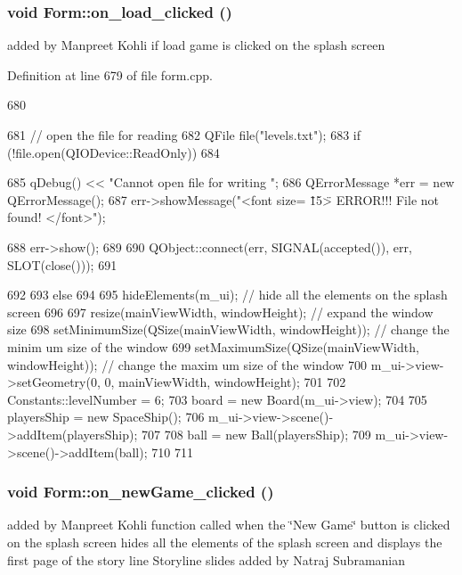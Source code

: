 \hypertarget{class_form_ad5cfc180c8653247d37045dcd7536f0b}{
\subsubsection[{on\_\-load\_\-clicked}]{\setlength{\rightskip}{0pt plus 5cm}void Form::on\_\-load\_\-clicked ()}}
\label{class_form_ad5cfc180c8653247d37045dcd7536f0b}
added by Manpreet Kohli if load game is clicked on the splash screen 

Definition at line 679 of file form.cpp.


\begin{DoxyCode}
680 {
681     // open the file for reading
682     QFile file("levels.txt");
683     if (!file.open(QIODevice::ReadOnly))
684     {
685         qDebug() << "Cannot open file for writing ";
686         QErrorMessage *err = new QErrorMessage();
687         err->showMessage("<font size= \"15\"> ERROR!!! File not found! </font>");
      
688         err->show();
689 
690         QObject::connect(err, SIGNAL(accepted()), err, SLOT(close()));
691     }
692 
693     else
694     {
695         hideElements(m_ui);     // hide all the elements on the splash screen
696 
697         resize(mainViewWidth, windowHeight);      // expand the window size
698         setMinimumSize(QSize(mainViewWidth, windowHeight));   // change the minim
      um size of the window
699         setMaximumSize(QSize(mainViewWidth, windowHeight));   // change the maxim
      um size of the window
700         m_ui->view->setGeometry(0, 0, mainViewWidth, windowHeight);
701 
702         Constants::levelNumber = 6;
703         board = new Board(m_ui->view);
704 
705         playersShip = new SpaceShip();
706         m_ui->view->scene()->addItem(playersShip);
707 
708         ball = new Ball(playersShip);
709         m_ui->view->scene()->addItem(ball);
710     }
711 }
\end{DoxyCode}
\hypertarget{class_form_af43a16a8fb1b1d955613a5aec4b87eea}{
\subsubsection[{on\_\-newGame\_\-clicked}]{\setlength{\rightskip}{0pt plus 5cm}void Form::on\_\-newGame\_\-clicked ()}}
\label{class_form_af43a16a8fb1b1d955613a5aec4b87eea}
added by Manpreet Kohli function called when the \char`\"{}New Game\char`\"{} button is clicked on the splash screen hides all the elements of the splash screen and displays the first page of the story line Storyline slides added by Natraj Subramanian 

